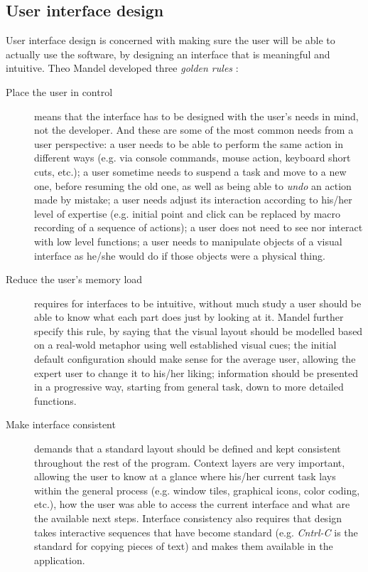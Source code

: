 \subsection{User interface design}
User interface design is concerned with making sure the user will be able to
actually use the software, by designing an interface that is meaningful and
intuitive. Theo Mandel developed three \emph{golden rules} \cite{TM97}:
\begin{description}
\item[Place the user in control] means that the interface has to be designed
with the user's needs in mind, not the developer. And these are some of the
most common needs from a user perspective: a user needs to be able to perform
the same action in different ways (e.g. via console commands, mouse action,
keyboard short cuts, etc.); a user sometime needs to suspend a task and move to
a new one, before resuming the old one, as well as being able to \emph{undo} an
action made by mistake; a user needs adjust its interaction according to his/her
level of expertise (e.g. initial point and click can be replaced by macro
recording of a sequence of actions); a user does not need to see nor interact
with low level functions; a user needs to manipulate objects of a visual
interface as he/she would do if those objects were a physical thing.
\item[Reduce the user's memory load] requires for interfaces to be intuitive,
without much study a user should be able to know what each part does just by
looking at it. Mandel \cite{TM97} further specify this rule, by saying that the
visual layout should be modelled based on a real-wold metaphor using well
established visual cues; the initial default configuration should make sense for
the average user, allowing the expert user to change it to his/her liking;
information should be presented in a progressive way, starting from general
task, down to more detailed functions.
\item[Make interface consistent] demands that a standard layout should be
defined and kept consistent throughout the rest of the program. Context layers
are very important, allowing the user to know at a glance where his/her current
task lays within the general process (e.g. window tiles, graphical icons, color
coding, etc.), how the user was able to access the current interface and what
are the available next steps. Interface consistency also requires that design
takes interactive sequences that have become standard (e.g. \emph{Cntrl-C} is
the standard for copying pieces of text) and makes them available in the
application.
\end{description}

